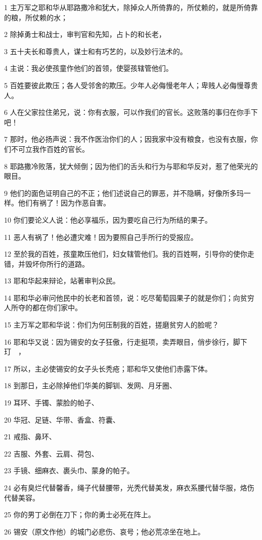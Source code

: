 \par 1 主万军之耶和华从耶路撒冷和犹大，除掉众人所倚靠的，所仗赖的，就是所倚靠的粮，所仗赖的水；
\par 2 除掉勇士和战士，审判官和先知，占卜的和长老，
\par 3 五十夫长和尊贵人，谋士和有巧艺的，以及妙行法术的。
\par 4 主说：我必使孩童作他们的首领，使婴孩辖管他们。
\par 5 百姓要彼此欺压；各人受邻舍的欺压。少年人必侮慢老年人；卑贱人必侮慢尊贵人。
\par 6 人在父家拉住弟兄，说：你有衣服，可以作我们的官长。这败落的事归在你手下吧！
\par 7 那时，他必扬声说：我不作医治你们的人；因我家中没有粮食，也没有衣服，你们不可立我作百姓的官长。
\par 8 耶路撒冷败落，犹大倾倒；因为他们的舌头和行为与耶和华反对，惹了他荣光的眼目。
\par 9 他们的面色证明自己的不正；他们述说自己的罪恶，并不隐瞒，好像所多玛一样。他们有祸了！因为作恶自害。
\par 10 你们要论义人说：他必享福乐，因为要吃自己行为所结的果子。
\par 11 恶人有祸了！他必遭灾难！因为要照自己手所行的受报应。
\par 12 至於我的百姓，孩童欺压他们，妇女辖管他们。我的百姓啊，引导你的使你走错，并毁坏你所行的道路。
\par 13 耶和华起来辩论，站著审判众民。
\par 14 耶和华必审问他民中的长老和首领，说：吃尽葡萄园果子的就是你们；向贫穷人所夺的都在你们家中。
\par 15 主万军之耶和华说：你们为何压制我的百姓，搓磨贫穷人的脸呢？
\par 16 耶和华又说：因为锡安的女子狂傲，行走挺项，卖弄眼目，俏步徐行，脚下玎　，
\par 17 所以，主必使锡安的女子头长秃疮；耶和华又使他们赤露下体。
\par 18 到那日，主必除掉他们华美的脚钏、发网、月牙圈、
\par 19 耳环、手镯、蒙脸的帕子、
\par 20 华冠、足链、华带、香盒、符囊、
\par 21 戒指、鼻环、
\par 22 吉服、外套、云肩、荷包、
\par 23 手镜、细麻衣、裹头巾、蒙身的帕子。
\par 24 必有臭烂代替馨香，绳子代替腰带，光秃代替美发，麻衣系腰代替华服，烙伤代替美容。
\par 25 你的男丁必倒在刀下；你的勇士必死在阵上。
\par 26 锡安（原文作他）的城门必悲伤、哀号；他必荒凉坐在地上。

